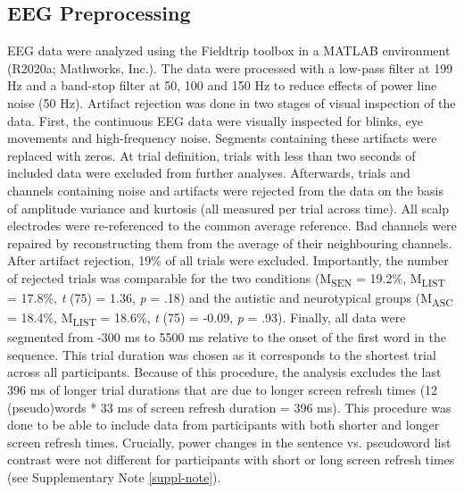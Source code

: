 \subsection{EEG Preprocessing} \label{preprocessing}
EEG data were analyzed using the Fieldtrip toolbox \citep{oostenveld2011} in a MATLAB environment (R2020a; Mathworks, Inc.). The data were processed with a low-pass filter at 199 Hz and a band-stop filter at 50, 100 and 150 Hz to reduce effects of power line noise (50 Hz). Artifact rejection was done in two stages of visual inspection of the data. First, the continuous EEG data were visually inspected for blinks, eye movements and high-frequency noise. Segments containing these artifacts were replaced with zeros. At trial definition, trials with less than two seconds of included data were excluded from further analyses. Afterwards, trials and channels containing noise and artifacts were rejected from the data on the basis of amplitude variance and kurtosis (all measured per trial across time). All scalp electrodes were re-referenced to the common average reference. Bad channels were repaired by reconstructing them from the average of their neighbouring channels. After artifact rejection, 19\% of all trials were excluded. Importantly, the number of rejected trials was comparable for the two conditions (M\textsubscript{SEN} = 19.2\%, M\textsubscript{LIST} = 17.8\%, \textit{t} (75) = 1.36, \textit{p} = .18) and the autistic and neurotypical groups (M\textsubscript{ASC} = 18.4\%, M\textsubscript{LIST} = 18.6\%, \textit{t} (75) = -0.09, \textit{p} = .93). Finally, all data were segmented from -300 ms to 5500 ms relative to the onset of the first word in the sequence. This trial duration was chosen as it corresponds to the shortest trial across all participants. Because of this procedure, the analysis excludes the last 396 ms of longer trial durations that are due to longer screen refresh times (12 (pseudo)words * 33 ms of screen refresh duration = 396 ms). This procedure was done to be able to include data from participants with both shorter and longer screen refresh times. Crucially, power changes in the sentence vs. pseudoword list contrast were not different for participants with short or long screen refresh times (see Supplementary Note \ref{suppl-note}).


